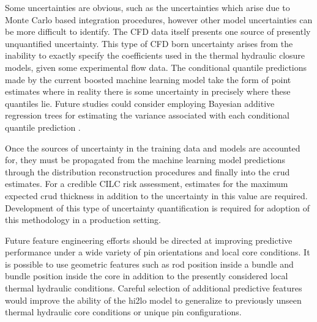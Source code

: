 Some uncertainties are obvious, such as the uncertainties which arise due to Monte Carlo based integration procedures, however other model uncertainties can be more difficult to identify.  The CFD data itself presents one source of presently unquantified uncertainty.  This type of CFD born uncertainty arises from the inability to exactly specify the coefficients used in the thermal hydraulic closure models, given some experimental flow data.  The conditional quantile predictions made by the current boosted machine learning model take the form of point estimates where in reality there is some uncertainty in precisely where these quantiles lie.  Future studies could consider employing Bayesian additive regression trees for estimating the variance associated with each conditional quantile prediction \cite{chipman2010}.


Once the sources of uncertainty in the training data and models are accounted for, they must be propagated from the machine learning model predictions through the distribution reconstruction procedures and finally into the crud estimates.  For a credible CILC risk assessment, estimates for the maximum expected crud thickness in addition to the uncertainty in this value are required. Development of this type of uncertainty quantification is required for adoption of this methodology in a production setting.

Future feature engineering efforts should be directed at improving predictive performance under a wide variety of pin orientations and local core conditions.  It is possible to use geometric features such as rod position inside a bundle and bundle position inside the core in addition to the presently considered local thermal hydraulic conditions.  Careful selection of additional predictive features would improve the ability of the hi2lo model to generalize to previously unseen thermal hydraulic core conditions or unique pin configurations.


